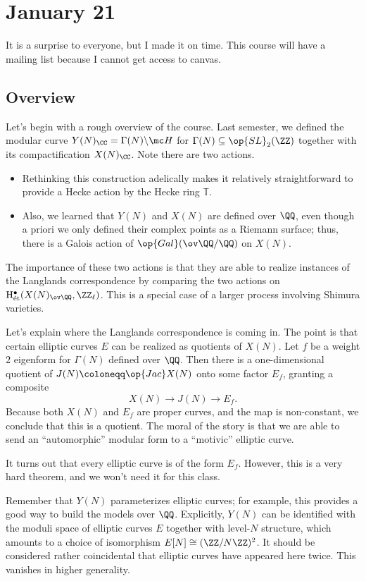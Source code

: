 \documentclass[../notes.tex]{subfiles}
\begin{document}
\section{January 21}

It is a surprise to everyone, but I made it on time. This course will have a mailing list because I cannot get access to canvas.

\subsection{Overview}
Let's begin with a rough overview of the course. Last semester, we defined the modular curve $Y(N)_\CC=\Gamma(N)\backslash\mc H$ for $\Gamma(N)\subseteq\op{SL}_2(\ZZ)$ together with its compactification $X(N)_\CC$. Note there are two actions.
\begin{itemize}
	\item Rethinking this construction adelically makes it relatively straightforward to provide a Hecke action by the Hecke ring $\mathbb T$.
	\item Also, we learned that $Y(N)$ and $X(N)$ are defined over $\QQ$, even though a priori we only defined their complex points as a Riemann surface; thus, there is a Galois action of $\op{Gal}(\ov\QQ/\QQ)$ on $X(N)$.
\end{itemize}
The importance of these two actions is that they are able to realize instances of the Langlands correspondence by comparing the two actions on $\mathrm H^\bullet_{\mathrm{\acute et}}(X(N)_{\ov\QQ},\ZZ_\ell)$. This is a special case of a larger process involving Shimura varieties.

Let's explain where the Langlands correspondence is coming in. The point is that certain elliptic curves $E$ can be realized as quotients of $X(N)$. Let $f$ be a weight $2$ eigenform for $\Gamma(N)$ defined over $\QQ$. Then there is a one-dimensional quotient of $J(N)\coloneqq\op{Jac}X(N)$ onto some factor $E_f$, granting a composite
\[X(N)\to J(N)\to E_f.\]
Because both $X(N)$ and $E_f$ are proper curves, and the map is non-constant, we conclude that this is a quotient. The moral of the story is that we are able to send an ``automorphic'' modular form to a ``motivic'' elliptic curve.
\begin{remark}
	It turns out that every elliptic curve is of the form $E_f$. However, this is a very hard theorem, and we won't need it for this class.
\end{remark}
Remember that $Y(N)$ parameterizes elliptic curves; for example, this provides a good way to build the models over $\QQ$. Explicitly, $Y(N)$ can be identified with the moduli space of elliptic curves $E$ together with level-$N$ structure, which amounts to a choice of isomorphism $E[N]\cong(\ZZ/N\ZZ)^2$. It should be considered rather coincidental that elliptic curves have appeared here twice. This vanishes in higher generality.
\end{document}
